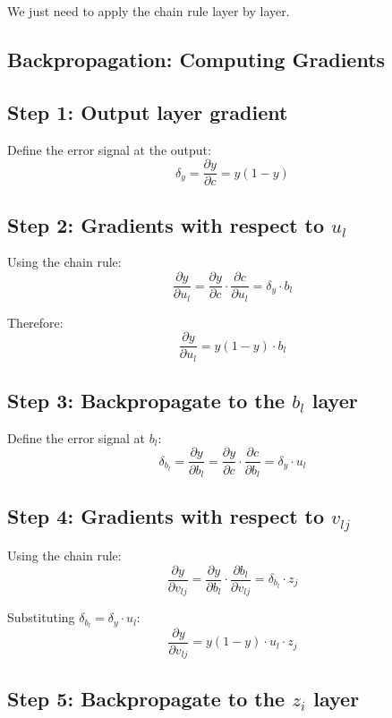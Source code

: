 \documentclass{tufte-handout}
\begin{document}
We just need to apply the chain rule layer by layer.

\subsection*{Backpropagation: Computing Gradients}

\subsection*{Step 1: Output layer gradient}

Define the error signal at the output:
\[
\delta_y = \frac{\partial y}{\partial c} = y(1-y)
\]

\subsection*{Step 2: Gradients with respect to $u_l$}

Using the chain rule:
\[
\frac{\partial y}{\partial u_l} = \frac{\partial y}{\partial c} \cdot \frac{\partial c}{\partial u_l} = \delta_y \cdot b_l
\]

Therefore:
\[
\boxed{\frac{\partial y}{\partial u_l} = y(1-y) \cdot b_l}
\]

\subsection*{Step 3: Backpropagate to the $b_l$ layer}

Define the error signal at $b_l$:
\[
\delta_{b_l} = \frac{\partial y}{\partial b_l} = \frac{\partial y}{\partial c} \cdot \frac{\partial c}{\partial b_l} = \delta_y \cdot u_l
\]

\subsection*{Step 4: Gradients with respect to $v_{lj}$}

Using the chain rule:
\[
\frac{\partial y}{\partial v_{lj}} = \frac{\partial y}{\partial b_l} \cdot \frac{\partial b_l}{\partial v_{lj}} = \delta_{b_l} \cdot z_j
\]

Substituting $\delta_{b_l} = \delta_y \cdot u_l$:
\[
\boxed{\frac{\partial y}{\partial v_{lj}} = y(1-y) \cdot u_l \cdot z_j}
\]

\subsection*{Step 5: Backpropagate to the $z_i$ layer}
\end{document}

